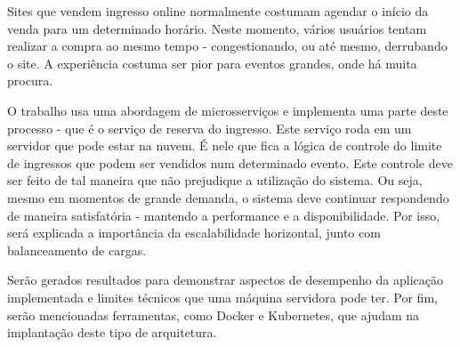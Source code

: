 
Sites que vendem ingresso online normalmente costumam agendar o início da venda
para um determinado horário.
Neste momento, vários usuários tentam realizar a compra ao mesmo tempo
- congestionando, ou até mesmo, derrubando o site.
A experiência costuma ser pior para eventos grandes, onde há muita procura.

O trabalho usa uma abordagem de microsserviços e implementa uma parte deste
processo - que é o serviço de reserva do ingresso.
Este serviço roda em um servidor que pode estar na nuvem.
É nele que fica a lógica de controle do limite de ingressos que podem
ser vendidos num determinado evento.
Este controle deve ser feito de tal maneira que não prejudique a utilização
do sistema.
Ou seja, mesmo em momentos de grande demanda, o sistema deve continuar
respondendo de maneira satisfatória - mantendo a performance e a disponibilidade.
Por isso, será explicada a importância da escalabilidade horizontal,
junto com balanceamento de cargas.

Serão gerados resultados para demonstrar aspectos de desempenho da aplicação
implementada e limites técnicos que uma máquina servidora pode ter. Por fim,
serão mencionadas ferramentas, como Docker e Kubernetes, que ajudam na
implantação deste tipo de arquitetura.

